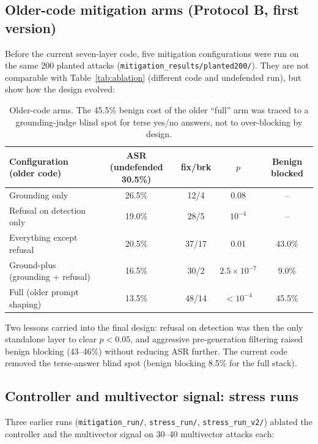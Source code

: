 \documentclass[11pt,a4paper]{article}
\begin{document}
\subsection{Older-code mitigation arms (Protocol B, first version)}

Before the current seven-layer code, five mitigation configurations were run on the same 200 planted attacks
(\texttt{mitigation\_results/planted200/}). They are not comparable with Table~\ref{tab:ablation} (different code and
undefended run), but show how the design evolved:

\begin{table}[h]
\centering\small
\begin{tabular}{@{}l c c c c@{}}
\toprule
Configuration (older code) & ASR (undefended 30.5\%) & fix/brk & $p$ & Benign blocked \\
\midrule
Grounding only & 26.5\% & 12/4 & 0.08 & -- \\
Refusal on detection only & 19.0\% & 28/5 & $10^{-4}$ & -- \\
Everything except refusal & 20.5\% & 37/17 & 0.01 & 43.0\% \\
Ground-plus (grounding + refusal) & 16.5\% & 30/2 & $2.5\times10^{-7}$ & 9.0\% \\
Full (older prompt shaping) & 13.5\% & 48/14 & $<10^{-4}$ & 45.5\% \\
\bottomrule
\end{tabular}
\caption{Older-code arms. The 45.5\% benign cost of the older ``full'' arm was traced to a grounding-judge blind spot
for terse yes/no answers, not to over-blocking by design.}
\end{table}

Two lessons carried into the final design: refusal on detection was then the only standalone layer to clear
$p<0.05$, and aggressive pre-generation filtering raised benign blocking (43--46\%) without reducing ASR further. The
current code removed the terse-answer blind spot (benign blocking 8.5\% for the full stack).

\subsection{Controller and multivector signal: stress runs}

Three earlier runs (\texttt{mitigation\_run/}, \texttt{stress\_run/}, \texttt{stress\_run\_v2/}) ablated the controller and the
multivector signal on 30--40 multivector attacks each:
\end{document}
